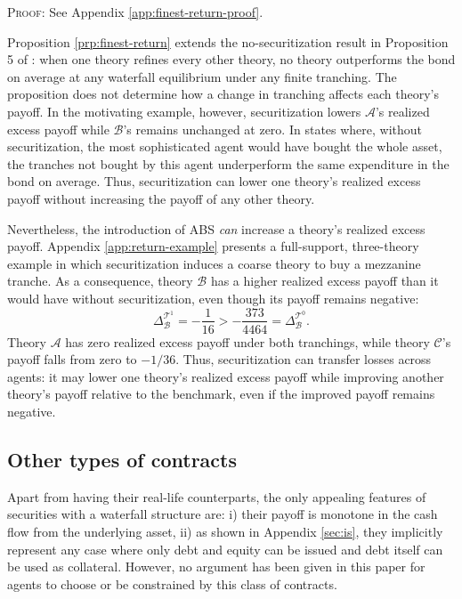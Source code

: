 \documentclass[11pt]{article}
\theoremstyle{plain}
\begin{document}
\textsc{Proof:} See Appendix \ref{app:finest-return-proof}.

Proposition \ref{prp:finest-return} extends the no-securitization result in Proposition 5 of \cite{EysterPiccione2014}: when one theory refines every other theory, no theory outperforms the bond on average at any waterfall equilibrium under any finite tranching. The proposition does not determine how a change in tranching affects each theory's payoff. In the motivating example, however, securitization lowers $\mathcal{A}$'s realized excess payoff while $\mathcal{B}$'s remains unchanged at zero. In states where, without securitization, the most sophisticated agent would have bought the whole asset, the tranches not bought by this agent underperform the same expenditure in the bond on average. Thus, securitization can lower one theory's realized excess payoff without increasing the payoff of any other theory.

Nevertheless, the introduction of ABS \textit{can} increase a theory's realized excess payoff. Appendix \ref{app:return-example} presents a full-support, three-theory example in which securitization induces a coarse theory to buy a mezzanine tranche. As a consequence, theory $\mathcal{B}$ has a higher realized excess payoff than it would have without securitization, even though its payoff remains negative:
\[
\Delta_\mathcal{B}^{\mathcal{T}^1}=-\frac{1}{16}>
-\frac{373}{4464}=\Delta_\mathcal{B}^{\mathcal{T}^0}.
\]
Theory $\mathcal{A}$ has zero realized excess payoff under both tranchings, while theory $\mathcal{C}$'s payoff falls from zero to $-1/36$. Thus, securitization can transfer losses across agents: it may lower one theory's realized excess payoff while improving another theory's payoff relative to the benchmark, even if the improved payoff remains negative.

\subsection{Other types of contracts} \label{sec:cds}

Apart from having their real-life counterparts, the only appealing features of securities with a waterfall structure are: i) their payoff is monotone in the cash flow from the underlying asset, ii) as shown in Appendix \ref{sec:is}, they implicitly represent any case where only debt and equity can be issued and debt itself can be used as collateral. However, no argument has been given in this paper for agents to choose or be constrained by this class of contracts.
\end{document}
